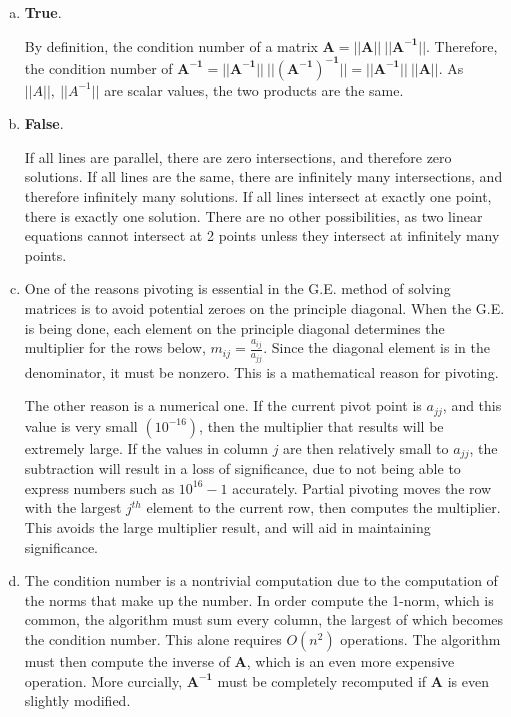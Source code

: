 \documentclass[11pt]{article}
\begin{document}
\begin{enumerate}
\begin{enumerate}[(a)]
		\item \textbf{True}.

		By definition, the condition number of a matrix $\mathbf{A = ||A||\ ||A^{-1}||}$. Therefore, the condition number of
		$\mathbf{A^{-1} = ||A^{-1}||\ ||(A^{-1})^{-1}|| = ||A^{-1}||\ ||A||}$. As $||A||,\ ||A^{-1}||$ are scalar values, the two products are the same. \\

		\item \textbf{False}.

		If all lines are parallel, there are zero intersections, and therefore zero solutions. If all lines are the same, there are
		infinitely many intersections, and therefore infinitely many solutions. If all lines intersect at exactly one point, there is
		exactly one solution. There are no other possibilities, as two linear equations cannot intersect at 2 points unless they
		intersect at infinitely many points.\\

		\item One of the reasons pivoting is essential in the G.E. method of solving matrices is to avoid potential zeroes on the principle
		diagonal. When the G.E. is being done, each element on the principle diagonal determines the multiplier for the rows below, $m_{ij}
		= \frac{a_{ij}}{a_{jj}}$. Since the diagonal element is in the denominator, it must be nonzero. This is a mathematical reason for
		pivoting.

		The other reason is a numerical one. If the current pivot point is $a_{jj}$, and this value is very small $(10^{-16})$, then the
		multiplier that results will be extremely large. If the values in column $j$ are then relatively small to $a_{jj}$, the subtraction
		will result in a loss of significance, due to not being able to express numbers such as $10^{16}-1$ accurately. Partial pivoting moves
		the row with the largest $j^{th}$ element to the current row, then computes the multiplier. This avoids the large multiplier result,
		and will aid in maintaining significance. \\

		\item The condition number is a nontrivial computation due to the computation of the norms that make up the number. In order
		compute the 1-norm, which is common, the algorithm must sum every column, the largest of which becomes the condition number.
		This alone requires $O(n^2)$ operations. The algorithm must then compute the inverse of $\mathbf{A}$, which is an even more
		expensive operation. More curcially, $\mathbf{A^{-1}}$ must be completely recomputed if $\mathbf{A}$ is even slightly
		modified. \\


\end{enumerate}
\end{enumerate}
\end{document}
